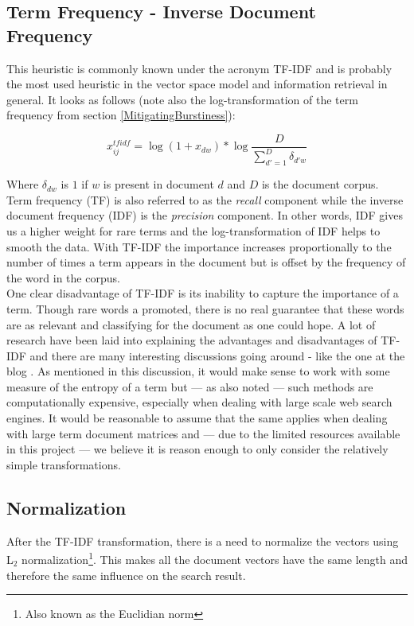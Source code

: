\subsection{Term Frequency - Inverse Document Frequency\label{TFIDF}}

This heuristic is commonly known under the acronym TF-IDF and is
probably the most used heuristic in the vector space model and
information retrieval in general. It looks as follows (note also the
log-transformation of the term frequency from
section \ref{MitigatingBurstiness}):

\[
x_{ij}^{tfidf} = \log{(1 + x_{dw})} * \log{ \frac{D}{\sum_{d\prime = 1}^{D}\delta_{d\prime w}}}
\]

Where $\delta_{dw}$ is $1$ if $w$ is present in document $d$ and $D$
is the document corpus. Term frequency (TF) is also referred to as the
\textit{recall} component while the inverse document frequency (IDF)
is the \textit{precision} component. In other words, IDF gives us a
higher weight for rare terms and the log-transformation of IDF helps
to smooth the data. With TF-IDF the importance increases
proportionally to the number of times a term appears in the document
but is offset by the frequency of the word in the corpus.\\

One clear disadvantage of TF-IDF is its inability to capture the
importance of a term. Though rare words a promoted, there is no real
guarantee that these words are as relevant and classifying for the
document as one could hope. A lot of research have been laid into
explaining the advantages and disadvantages of TF-IDF and there are
many interesting discussions going around - like the one at the blog
\cite{UnderstandingTFIDF}. As mentioned in this discussion, it would
make sense to work with some measure of the entropy of a term but --- as
also noted --- such methods are computationally expensive, especially
when dealing with large scale web search engines. It would be
reasonable to assume that the same applies when dealing with large
term document matrices and --- due to the limited resources available in
this project --- we believe it is reason enough to only consider the
relatively simple transformations.

\subsection{Normalization} 

After the TF-IDF transformation, there is a need to normalize the
vectors using L$_2$ normalization\footnote{Also known as the
  Euclidian norm}. This makes all the document vectors have the same
length and therefore the same influence on the search result.

